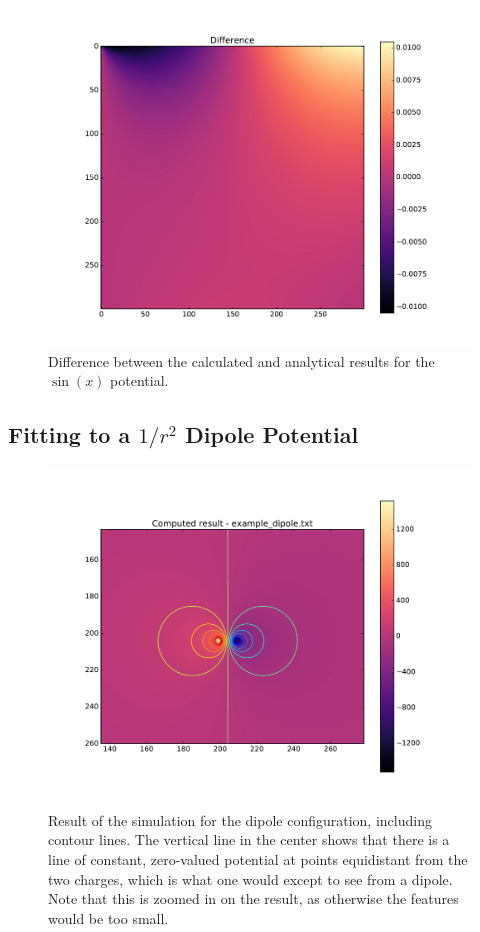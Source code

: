 	\begin{figure}[h]
	\centering
	\includegraphics[width=1.1\linewidth]{sin300_diff.pdf}
	\caption{Difference between the calculated and analytical results for the $\sin(x)$ potential.}
	\label{fig:sin-difference}
	\end{figure}

\subsection{Fitting to a $1/r^2$ Dipole Potential}
\begin{figure}[h!]
	\centering
	\center
	\includegraphics[width=1.0\linewidth]{dipole_contours.pdf}
	\caption[Result of the simulation for the dipole configuration, including contour lines.]{Result of the simulation for the dipole configuration, including contour lines. The vertical line in the center shows that there is a line of constant, zero-valued
	potential at points equidistant from the two charges, which is what one would except to see from a dipole. Note that this is zoomed in on the result, as otherwise the features
	would be too small.} \label{fig:dipole-cont}
	\end{figure}


